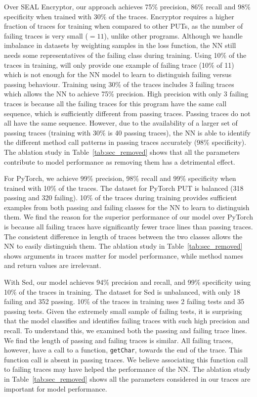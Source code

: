Over SEAL Encryptor, our approach achieves 75\% precision, 86\% recall and 98\% specificity when trained with 30\% of the traces. Encryptor requires a higher fraction of traces for training when compared to other PUTs, as the number of failing traces is very small ($= 11$), unlike other programs. Although we handle imbalance in datasets by weighting samples in the loss function, the NN still needs some representatives of the failing class during training. Using 10\% of the traces in training, will only provide one example of failing trace (10\% of 11)  which is not enough for the NN model to learn to distinguish failing versus passing behaviour. Training using 30\% of the traces includes 3 failing traces which allows the NN to achieve 75\% precision. High precision with only 3 failing traces is because all the failing traces for this program have the same call sequence, which is sufficiently different from passing traces. Passing traces do not all have the same sequence. However, due to the availability of a larger set of passing traces (training with 30\% is 40 passing traces), the NN is able to identify the different method call patterns in passing traces accurately (98\% specificity).  The ablation study in Table~\ref{tab:sec_removed} shows that all the parameters contribute to model performance as removing them has a detrimental effect. 

For PyTorch, we achieve 99\% precision, 98\% recall and 99\% specificity when trained with 10\% of the traces. The dataset for PyTorch PUT is balanced (318 passing and 320 failing). 10\% of the traces during training provides sufficient examples from both passing and failing classes for the NN to learn to distinguish them. We find the reason for the superior performance of our model over PyTorch is because all failing traces have significantly fewer trace lines than passing traces. The consistent difference in length of traces between the two classes allows the NN to easily distinguish them. The ablation study in Table~\ref{tab:sec_removed} shows arguments in traces matter for model performance, while  method names and return values are irrelevant.  %


With Sed, our model achieves 94\% precision and recall, and 99\% specificity using 10\% of the traces in training. The dataset for Sed is unbalanced, with only 18 failing and 352 passing. 10\% of the traces in training uses 2 failing tests and 35 passing tests. Given the extremely small sample of failing tests, it is surprising that the model classifies and identifies failing traces with such high precision and recall. To understand this, we examined both the passing and failing trace lines. We find the length of passing and failing traces is similar. All failing traces, however, have a call to a function, \texttt{getChar}, towards the end of the trace. This function call is absent in passing traces. We believe associating this function call to failing traces may have helped the performance of the NN. The ablation study in Table~\ref{tab:sec_removed} shows all the parameters considered in our traces are important for model performance. 

